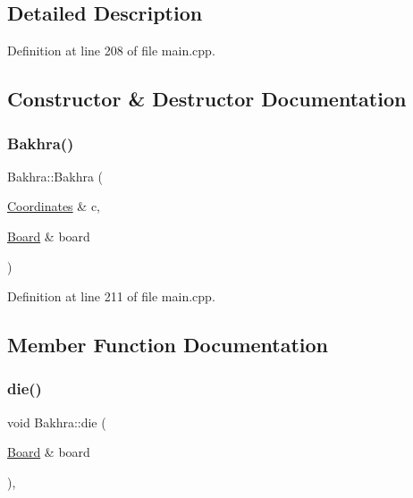 \subsection{Detailed Description}


Definition at line 208 of file main.\+cpp.



\subsection{Constructor \& Destructor Documentation}
\mbox{\label{class_bakhra_a89d45256f1c671abb089dd1a3cc3f0f0}} 
\subsubsection{\texorpdfstring{Bakhra()}{Bakhra()}}
{\footnotesize\ttfamily Bakhra\+::\+Bakhra (\begin{DoxyParamCaption}\item[{\mbox{\hyperlink{class_coordinates}{Coordinates}} \&}]{c,  }\item[{\mbox{\hyperlink{class_board}{Board}} \&}]{board }\end{DoxyParamCaption})\hspace{0.3cm}{\ttfamily [inline]}}



Definition at line 211 of file main.\+cpp.



\subsection{Member Function Documentation}
\mbox{\label{class_bakhra_a851d699afa7dc2180e1aaf18bd6160f9}} 
\subsubsection{\texorpdfstring{die()}{die()}}
{\footnotesize\ttfamily void Bakhra\+::die (\begin{DoxyParamCaption}\item[{\mbox{\hyperlink{class_board}{Board}} \&}]{board }\end{DoxyParamCaption})\hspace{0.3cm}{\ttfamily [inline]}, {\ttfamily [virtual]}}



